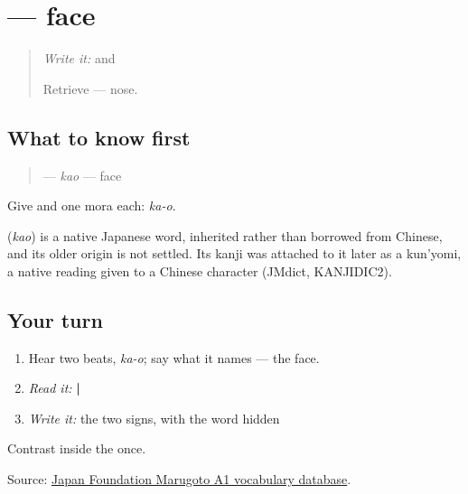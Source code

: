 \section[\texorpdfstring{\ja{かお} (kao)}{かお (kao)}]{ — face}

\label{lesson:JA-C11-kao}



\begin{quote}
\emph{Write it:} \textbf{} and \textbf{}

Retrieve \textbf{} — nose.
\end{quote}

\subsection*{What to know first}
\begin{quote}
\textbf{} — \emph{kao} — face
\end{quote}

Give \textbf{} and \textbf{} one mora each: \emph{ka-o}.

\begin{cousinweb}
\textbf{} (\emph{kao}) is a native Japanese word, inherited rather than borrowed from Chinese, and its older origin is not settled. Its kanji was attached to it later as a kun'yomi, a native reading given to a Chinese character (JMdict, KANJIDIC2).
\end{cousinweb}

\subsection*{Your turn}
\begin{enumerate}
\raggedright
  \item Hear two beats, \emph{ka-o}; say what it names — the face.
  \item \emph{Read it:} \textbf{ | }
  \item \emph{Write it:} the two signs, with the word hidden
\end{enumerate}

\begin{tcolorbox}[breakable,colback=teal!4,colframe=teal!35!black,title={Before you move on}]
Contrast \textbf{} inside the \textbf{} once.

Source: \href{https://words.marugotoweb.jp/}{Japan Foundation Marugoto A1 vocabulary database}.
\end{tcolorbox}
